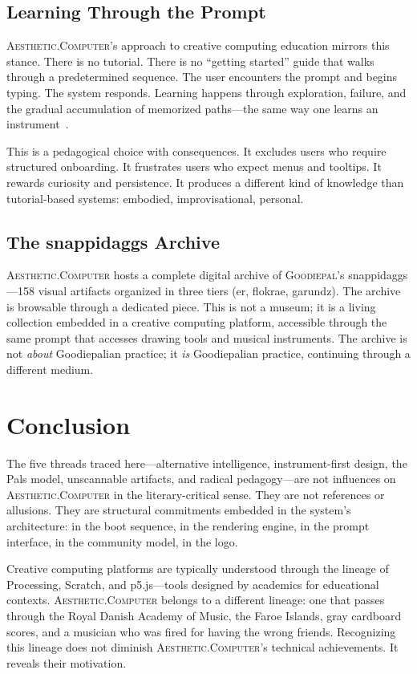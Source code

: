 \documentclass[10pt,letterpaper,twocolumn]{article}
\newcommand{\ac}{\textsc{Aesthetic.Computer}}
\newcommand{\gp}{\textsc{Goodiepal}}
\begin{document}
\subsection{Learning Through the Prompt}

\ac{}'s approach to creative computing education mirrors this stance. There is no tutorial. There is no ``getting started'' guide that walks through a predetermined sequence. The user encounters the prompt and begins typing. The system responds. Learning happens through exploration, failure, and the gradual accumulation of memorized paths---the same way one learns an instrument~\citep{papert1980mindstorms}.

This is a pedagogical choice with consequences. It excludes users who require structured onboarding. It frustrates users who expect menus and tooltips. It rewards curiosity and persistence. It produces a different kind of knowledge than tutorial-based systems: embodied, improvisational, personal.

\subsection{The snappidaggs Archive}

\ac{} hosts a complete digital archive of \gp{}'s snappidaggs---158 visual artifacts organized in three tiers (er, flokrae, garundz). The archive is browsable through a dedicated piece. This is not a museum; it is a living collection embedded in a creative computing platform, accessible through the same prompt that accesses drawing tools and musical instruments. The archive is not \emph{about} Goodiepalian practice; it \emph{is} Goodiepalian practice, continuing through a different medium.

\section{Conclusion}

The five threads traced here---alternative intelligence, instrument-first design, the Pals model, unscannable artifacts, and radical pedagogy---are not influences on \ac{} in the literary-critical sense. They are not references or allusions. They are structural commitments embedded in the system's architecture: in the boot sequence, in the rendering engine, in the prompt interface, in the community model, in the logo.

Creative computing platforms are typically understood through the lineage of Processing, Scratch, and p5.js---tools designed by academics for educational contexts. \ac{} belongs to a different lineage: one that passes through the Royal Danish Academy of Music, the Faroe Islands, gray cardboard scores, and a musician who was fired for having the wrong friends. Recognizing this lineage does not diminish \ac{}'s technical achievements. It reveals their motivation.
\end{document}
